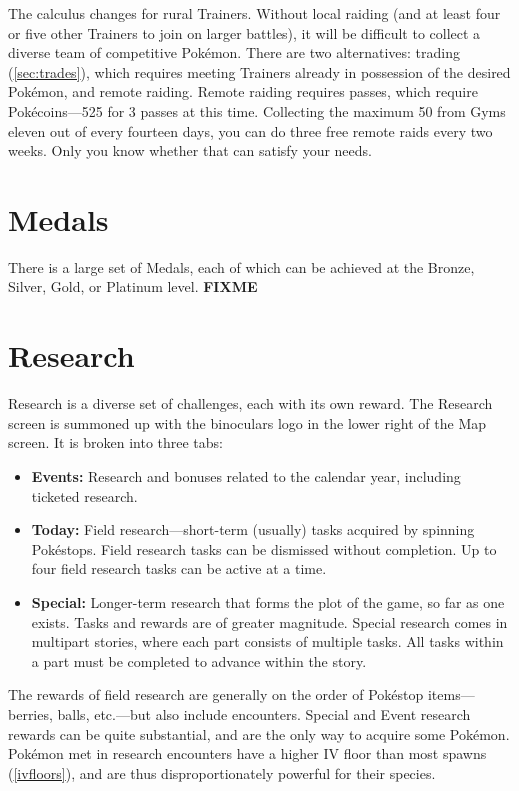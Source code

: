 The calculus changes for rural Trainers.
Without local raiding (and at least four or five other Trainers to join on larger battles),
  it will be difficult to collect a diverse team of competitive Pokémon.
There are two alternatives: trading (\autoref{sec:trades}), which requires meeting Trainers
  already in possession of the desired Pokémon, and remote raiding.
Remote raiding requires passes, which require Pokécoins---525 for 3 passes at this time.
Collecting the maximum 50 from Gyms eleven out of every fourteen days, you can do
  three free remote raids every two weeks.
Only you know whether that can satisfy your needs.

\section{Medals}
\label{sec:medals}
There is a large set of Medals, each of which can be achieved at the Bronze,
 Silver, Gold, or Platinum level.
\textbf{FIXME}

\section{Research}
\label{sec:research}
Research is a diverse set of challenges, each with its own reward.
The Research screen is summoned up with the binoculars logo in the lower right of the Map screen.
It is broken into three tabs:
\begin{itemize}
  \item \textbf{Events:} Research and bonuses related to the calendar year, including ticketed research.
  \item \textbf{Today:} Field research---short-term (usually) tasks acquired by spinning Pokéstops.
            Field research tasks can be dismissed without completion.
            Up to four field research tasks can be active at a time.
  \item \textbf{Special:} Longer-term research that forms the plot of the game, so far as
            one exists. Tasks and rewards are of greater magnitude.
            Special research comes in multipart stories, where each part consists of multiple tasks.
            All tasks within a part must be completed to advance within the story.
\end{itemize}
The rewards of field research are generally on the order of Pokéstop items---berries, balls,
 etc.---but also include encounters.
Special and Event research rewards can be quite substantial, and are the only way to acquire some Pokémon.
Pokémon met in research encounters have a higher IV floor than most spawns (\autoref{ivfloors}),
  and are thus disproportionately powerful for their species.
